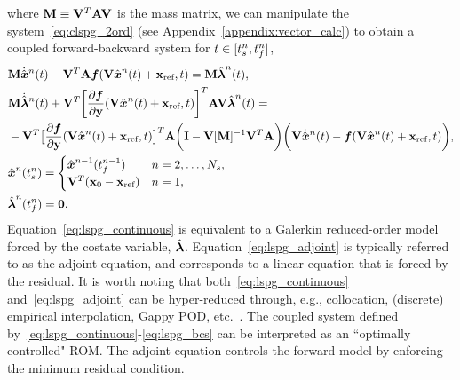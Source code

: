 where
$\massArgnt{n} \equiv \basisspace^T \stweightingMatArgt{n}{t} \basisspace$ is the
mass matrix,
we can manipulate the system~\eqref{eq:clspg_2ord} (see
Appendix~\ref{appendix:vector_calc}) to obtain a coupled forward-backward
system for $t \in  [\timeStartArg{n},\timeEndArg{n}]$,
\begin{align}\label{eq:lspg_continuous} 
&\mass   \genstateDotArg{n}{t}  -  \basisspace^T
\stweightingMatArgt{n}{t} \velocity(\veloargsromn) =  \mass \adjointArg{n}{t} , \\
 &\mass  \adjointDotArg{n}{t}  + \basisspace^T \bigg[\frac{\partial
\velocity}{\partial \stateyDiscrete} (\basisspace \genstateArg{n}{t} +
\stateIntercept,t) \bigg]^T \stweightingMatArgt{n}{t} \basisspace
 \adjointArg{n}{t} = \nonumber \\ &-\basisspace^T \big[
\frac{\partial \velocity}{\partial \stateyDiscrete}(\basisspace \genstateArg{n}{t} +
\stateIntercept,t) \big]^T \stweightingMatArgt{n}{t} \bigg( \mathbf{I} -
\basisspace [\massArgnt{n}]^{-1} \basisspace^T \stweightingMatArgt{n}{t} \bigg)
 \bigg( \basisspace \genstateDotArg{n}{t} -
\velocity(\veloargsromn) \bigg), \label{eq:lspg_adjoint} \\ &
\genstateArg{n}{\timeStartArg{n}} = \begin{cases}
\genstate^{n-1}(\timeEndArg{n-1}) & n=2,\ldots,\nslabs, \label{eq:lspg_bcs1}\\
\basisspace^T(\stateFOMIC - \stateIntercept) & n=1, \end{cases}\\ &
\adjointArg{n}{\timeEndArg{n}} = \boldsymbol 0. \label{eq:lspg_bcs} 
\end{align} 
Equation~\eqref{eq:lspg_continuous} is equivalent to a Galerkin reduced-order
model forced by the costate variable, $\adjoint$.
Equation~\eqref{eq:lspg_adjoint} is typically referred to as the adjoint
equation, and corresponds to a linear equation that is forced by the residual.
It is worth noting that both~\eqref{eq:lspg_continuous}
and~\eqref{eq:lspg_adjoint} can be hyper-reduced through, e.g.,
collocation, (discrete) empirical interpolation, Gappy POD, etc.~\cite{everson_sirovich_gappy,eim,qdeim_drmac}. The
coupled system defined by~\eqref{eq:lspg_continuous}-\eqref{eq:lspg_bcs} can be interpreted as an ``optimally controlled"
ROM. The adjoint equation controls the forward model by enforcing the minimum
residual condition.


